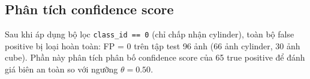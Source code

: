 
\subsection{Phân tích confidence score}
\label{subsec:ai3-conf}

Sau khi áp dụng bộ lọc \texttt{class\_id == 0} (chỉ chấp nhận
cylinder), toàn bộ false positive bị loại hoàn toàn: FP = 0 trên
tập test 96 ảnh (66 ảnh cylinder, 30 ảnh cube). Phần này phân
tích phân bố confidence score của 65 true positive để đánh giá
biên an toàn so với ngưỡng $\theta = 0.50$.

